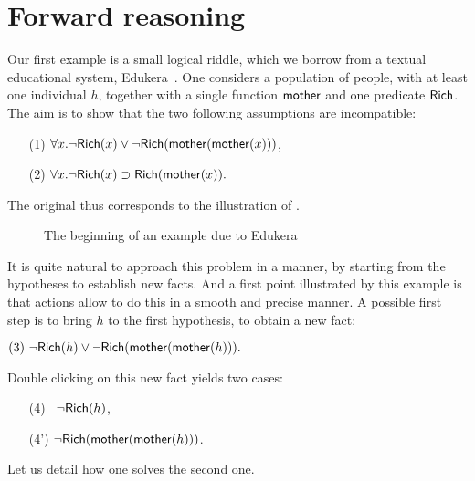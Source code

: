 
\section{Forward reasoning}


Our first example is a small logical riddle, which we borrow from a textual
educational system, Edukera~. One considers a population of
people, with at least one individual $h$, together with a single function
$\mbox{\textsf{mother}}$ and one predicate $\mbox{\textsf{Rich}}$. The aim is to show that the two following
assumptions are incompatible:
\begin{itemize}
\item[(1)] $\forall x. \neg\mbox{\textsf{Rich}}(x)\lor \neg\mbox{\textsf{Rich}}(\mbox{\textsf{mother}}(\mbox{\textsf{mother}}(x)))$,
\item[(2)] $\forall x. \neg\mbox{\textsf{Rich}}(x) \supset \mbox{\textsf{Rich}}(\mbox{\textsf{mother}}(x)).$
\end{itemize}
The original  thus corresponds to the illustration of .

\begin{figure*}
  \caption{The beginning of an example due to Edukera}
\end{figure*}

It is quite natural to approach this problem in a  manner, by starting
from the hypotheses to establish new facts. And a first point illustrated by
this example is that  actions allow to do this in a smooth and precise
manner. A possible first step is to bring $h$ to the first hypothesis, to obtain
a new fact:

\medskip
$(3) ~\neg\mbox{\textsf{Rich}}(h)\lor \neg\mbox{\textsf{Rich}}(\mbox{\textsf{mother}}(\mbox{\textsf{mother}}(h))).$
\medskip

\noindent Double clicking on this new fact yields two cases:
\begin{itemize}
 \item[(4)~] $ \neg\mbox{\textsf{Rich}}(h)$,
 \item[(4')] $ \neg\mbox{\textsf{Rich}}(\mbox{\textsf{mother}}(\mbox{\textsf{mother}}(h)))$.
 \end{itemize}
Let us detail how one solves the
second one.

